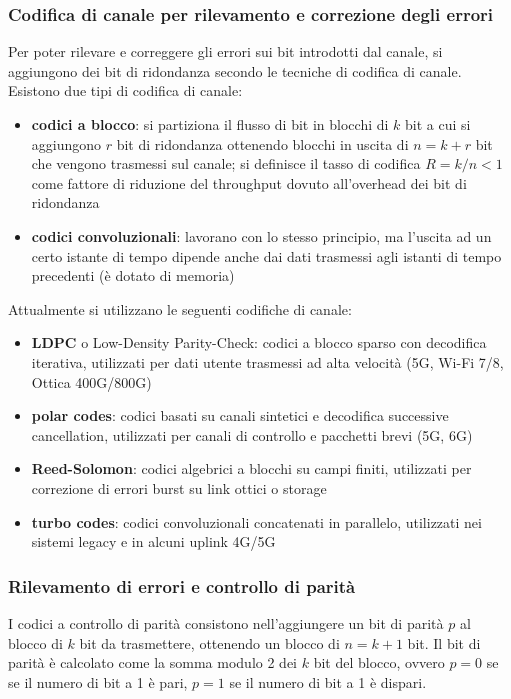 \subsubsection*{Codifica di canale per rilevamento e correzione degli errori}
Per poter rilevare e correggere gli errori sui bit introdotti dal canale, si aggiungono dei bit di ridondanza secondo
le tecniche di codifica di canale. Esistono due tipi di codifica di canale:
\begin{itemize}
	\item \textbf{codici a blocco}: si partiziona il flusso di bit in blocchi di \(k\) bit a cui si aggiungono \(r\) bit
	di ridondanza ottenendo blocchi in uscita di \(n = k + r\) bit che vengono trasmessi sul canale; si definisce il tasso
	di codifica \(R = k/n < 1\) come fattore di riduzione del throughput dovuto all'overhead dei bit di ridondanza

	\item \textbf{codici convoluzionali}: lavorano con lo stesso principio, ma l'uscita ad un certo istante di tempo dipende
	anche dai dati trasmessi agli istanti di tempo precedenti (è dotato di memoria)
\end{itemize}

\noindent
Attualmente si utilizzano le seguenti codifiche di canale:
\begin{itemize}
	\item \textbf{LDPC} o Low-Density Parity-Check: codici a blocco sparso con decodifica iterativa, utilizzati per dati
	utente trasmessi ad alta velocità (5G, Wi-Fi 7/8, Ottica 400G/800G)
	\item \textbf{polar codes}: codici basati su canali sintetici e decodifica successive cancellation, utilizzati per
	canali di controllo e pacchetti brevi (5G, 6G)
	\item \textbf{Reed-Solomon}: codici algebrici a blocchi su campi finiti, utilizzati per correzione di errori burst
	su link ottici o storage
	\item \textbf{turbo codes}: codici convoluzionali concatenati in parallelo, utilizzati nei sistemi legacy e in alcuni
	uplink 4G/5G
\end{itemize}

\subsubsection*{Rilevamento di errori e controllo di parità}
I codici a controllo di parità consistono nell'aggiungere un bit di parità \(p\) al blocco di \(k\) bit da trasmettere,
ottenendo un blocco di \(n = k + 1\) bit. Il bit di parità è calcolato come la somma modulo 2 dei \(k\) bit del blocco,
ovvero \(p=0\) se se il numero di bit a 1 è pari, \(p=1\) se il numero di bit a 1 è dispari.


